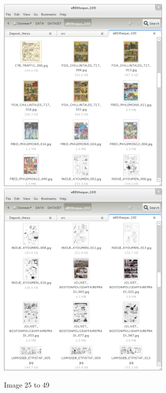  \begin{figure}[h!]  %
    \centering
    
    \includegraphics[trim= 5px 10px 30px 152px, clip, width=0.75\textwidth]{thumb_03.png}
    \\
    \includegraphics[trim= 5px 10px 30px 152px, clip, width=0.75\textwidth]{thumb_04.png}
    \caption{Image 25 to 49}
    \label{fig:app:3_4}
  \end{figure}


